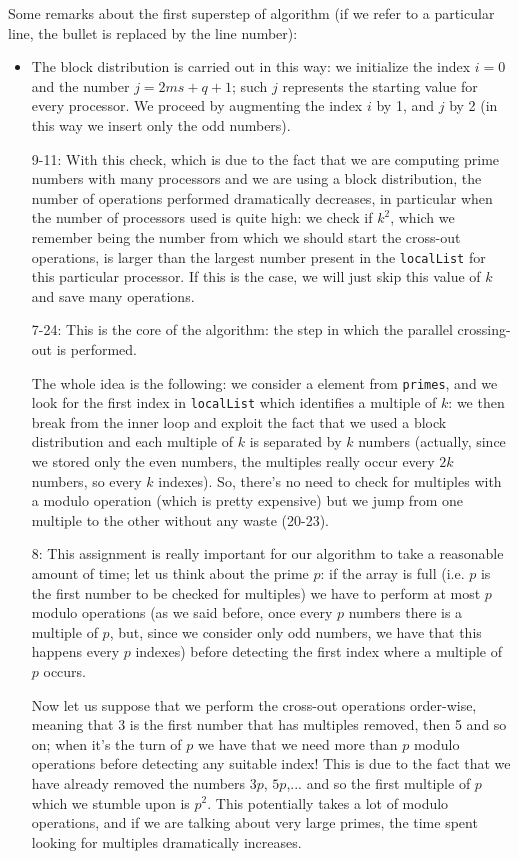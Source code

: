 \documentclass[a4paper,11pt]{article}
\begin{document}
Some remarks about the first superstep of algorithm (if we refer to a particular line, the bullet is replaced by the line number):

\begin{itemize}
\item The block distribution is carried out in this way: we initialize the index $i=0$ and the number $j= 2ms+q+1$; such $j$ represents the starting value for every processor. We proceed by augmenting the index $i$ by 1, and $j$ by 2 (in this way we insert only the odd numbers).
\item[9-11:] With this check, which is due to the fact that we are computing prime numbers with many processors and we are using a block distribution, the number of operations performed dramatically decreases, in particular when the number of processors used is quite high: we check if $k^2$, which we remember being the number from which we should start the cross-out operations, is larger than the largest number present in the \verb|localList| for this particular processor. If this is the case, we will just skip this value of $k$ and save many operations.
\item[7-24:] This is the core of the algorithm: the step in which the parallel crossing-out is performed.

The whole idea is the following: we consider a element from \verb|primes|, and we look for the first index in \verb|localList| which identifies a multiple of $k$: we then break from the inner loop and exploit the fact that we used a block distribution and each multiple of $k$ is separated by $k$ numbers (actually, since we stored only the even numbers, the multiples really occur every $2k$ numbers, so every $k$ indexes). So, there's no need to check for multiples with a modulo operation (which is pretty expensive) but we jump from one multiple to the other without any waste (20-23).

\item[8:] This assignment is really important for our algorithm to take a reasonable amount of time; let us think about the prime $p$: if the array is full (i.e. $p$ is the first number to be checked for multiples) we have to perform at most $p$ modulo operations (as we said before, once every $p$ numbers there is a multiple of $p$, but, since we consider only odd numbers, we have that this happens every $p$ indexes) before detecting the first index where a multiple of $p$ occurs.

Now let us suppose that we perform the cross-out operations order-wise, meaning that 3 is the first number that has multiples removed, then 5 and so on; when it's the turn of $p$ we have that we need more than $p$ modulo operations before detecting any suitable index! This is due to the fact that we have already removed the numbers $3p$, $5p$,... and so the first multiple of $p$ which we stumble upon is $p^2$. This potentially takes a lot of modulo operations, and if we are talking about very large primes, the time spent looking for multiples dramatically increases.


\end{itemize}
\end{document}
